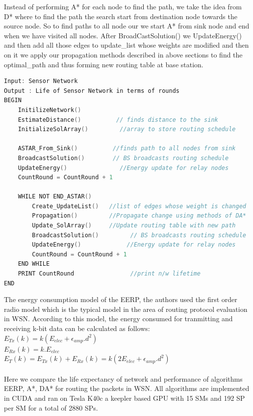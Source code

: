\documentclass[a4paper]{article}
\begin{document}
Instead of performing A* for each node to find the path, we take the idea from D*\cite{original D*} where to find the path the search start from destination node towards the source node. So to find paths to all node our we start A* from sink node and end when we have visited all nodes. After BroadCastSolution() we UpdateEnergy() and then add all those edges to update\_list whose weights are modified and then on it we apply  our propagation methods described in above sections to find the optimal\_path and thus forming new routing table at base station.
\begin{lstlisting}[language=C, caption=Pseud Code with DA* integerted, label=WSNDA]
Input: Sensor Network
Output : Life of Sensor Network in terms of rounds
BEGIN
    InitilizeNetwork()
    EstimateDistance()          // finds distance to the sink
    InitializeSolArray()         //array to store routing schedule
    
    ASTAR_From_Sink()          //finds path to all nodes from sink
    BroadcastSolution()        // BS broadcasts routing schedule
    UpdateEnergy()               //Energy update for relay nodes
    CountRound = CountRound + 1
    
    WHILE NOT END_ASTAR()
        Create_UpdateList()   //list of edges whose weight is changed
        Propagation()         //Propagate change using methods of DA*  
        Update_SolArray()     //Update routing table with new path
        BroadcastSolution()         // BS broadcasts routing schedule
        UpdateEnergy()             //Energy update for relay nodes
        CountRound = CountRound + 1
    END WHILE
    PRINT CountRound                //print n/w lifetime 
END
\end{lstlisting}
The energy consumption model of the EERP\cite{WSN2014}, the authors used the first order radio model which is the typical model in the area of routing protocol evaluation in WSN\cite{WSN_energy}. According to this model, the energy consumed for tranmitting and receiving k-bit data can be calculated as follows\cite{WSN_energy}:\\
$E_{Tx}(k) = k (E_{elec} + \epsilon_{amp}.d^2)$\\
$E_{Rx}(k) = k.E_{elec} $\\
$E_T(k) = E_{Tx}(k) + E_{Rx}(k) = k(2E_{elec} +\epsilon_{amp}.d^2)$\\
\\
Here we compare the life expectancy of network and performance of algorithms EERP\cite{WSN2014}, A*\cite{A*}, DA* for routing the packets in WSN. All algorithms are implemented in CUDA and ran on Tesla K40c a keepler based GPU with 15 SMs and 192 SP per SM for a total of 2880 SPs.
\end{document}
